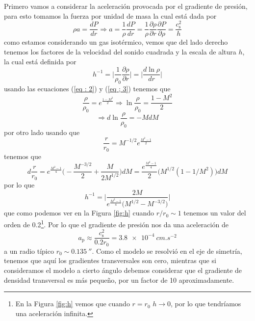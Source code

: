 \documentclass{book}
\begin{document}
Primero vamos a considerar la aceleración provocada por el gradiente
de presión, para esto tomamos la fuerza por unidad de masa la cual
está dada por
\begin{equation}
\rho a = \frac{dP}{dr}\Rightarrow a= \frac{1}{\rho}\frac{dP}{dr}=\frac{1}{\rho}\frac{\partial \rho}{\partial r}\frac{\partial P}{\partial\rho}=\frac{c_\mathrm{s}^2}{h}
\end{equation}
como estamos considerando un gas isotérmico, vemos que del lado
derecho tenemos los factores de la velocidad del sonido cuadrada y la
escala de altura $h$, la cual está definida por
\begin{equation}
h^{-1}=\Big|\frac{1}{\rho_0}\frac{\partial\rho}{\partial r}\Big|=\Big|\frac{d \ln \rho}{dr}\Big|
\end{equation}
usando las ecuaciones (\ref{eq : 2}) y (\ref{eq ; 3}) tenemos que 
\begin{equation}
\frac{\rho}{\rho_0}=e^{\frac{1-M^2}{2}}\Rightarrow\ln\frac{\rho}{\rho_0}=\frac{1-M^2}{2}
\end{equation}
\begin{equation}
\Rightarrow d\ln\frac{\rho}{\rho_0}=-M dM
\end{equation}
por otro lado usando que 
\begin{equation}
\frac{r}{r_0}=M^{-1/2}e^{\frac{M^2-1}{2}}
\end{equation}
tenemos que 
\begin{equation}
d\frac{r}{r_0}=e^{\frac{M^2-1}{4}}\Big(-\frac{M^{-3/2}}{2}+\frac{M}{2M^{1/2}}\Big)dM = \frac{e^{\frac{M^2-1}{4}}}{2}\Big(M^{1/2}(1-1/M^2) \Big)dM
\end{equation}
por lo que 
\begin{equation}
h^{-1}=\Big|\frac{2M}{e^{\frac{M^2-1}{4}}\Big(M^{1/2}-M^{-3/2}\Big)}\Big|
\end{equation}
que como podemos ver en la Figura \ref{fig:h} cuando $r/r_0\sim 1$
tenemos un valor del orden de 0.2\footnote{En la Figura \ref{fig:h}
  vemos que cuando $r=r_0$ $h\to 0$, por lo que tendríamos una
  aceleración infinita.}. Por lo que el gradiente de presión nos da
una aceleración de
\begin{equation}
a_\mathrm{p} \approx \frac{c_\mathrm{s}^2}{0.2 r_0} = \SI{3.8e-4}{cm.s^{-2}}
\end{equation}
a un radio típico $r_0\sim \SI{0.135}{\arcsecond}$. Como el modelo se
resolvió en el eje de simetría, tenemos que aquí los gradientes
transversales son cero, mientras que si consideramos el modelo a
cierto ángulo debemos considerar que el gradiente de densidad
transversal es más pequeño, por un factor de 10 aproximadamente.
\end{document}
